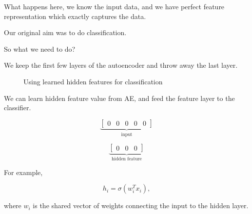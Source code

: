 \documentclass{article}
\begin{document}
What happens here, we know the input data, and we have perfect feature
representation which exactly captures the data.

Our original aim was to do classification.

So what we need to do?

We keep the first few layers of the autoencoder and throw away the
last layer.

\begin{figure}[H]
	\centering
	\caption{Using learned hidden features for classification}
\end{figure}

We can learn hidden feature value from AE, and feed the feature layer
to the classifier.

\[
\underbrace{
	\begin{bmatrix}
		0&0&0&0&0
	\end{bmatrix}
}_{\text{input}}
\]

\[
\underbrace{
	\begin{bmatrix}
		0&0&0
	\end{bmatrix}
}_{\text{hidden feature}}
\]

For example,

\[
h_i=\sigma(w_i^T x_i),
\]

where \(w_i\) is the shared vector of weights connecting the input to
the hidden layer.
\end{document}
